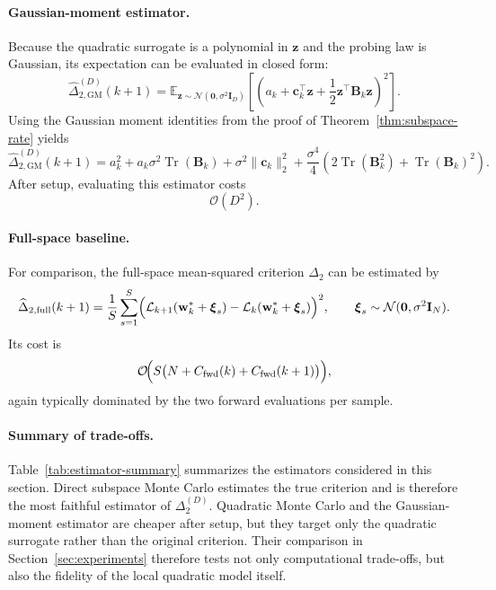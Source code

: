 \documentclass[10pt]{article}
\theoremstyle{plain}
\theoremstyle{remark}
\begin{document}
\paragraph{Gaussian-moment estimator.}
Because the quadratic surrogate is a polynomial in $\mathbf z$ and the probing law is Gaussian, its expectation can be evaluated in closed form:
\begin{equation}
\label{eq:quad-closed-form}
\widehat{\Delta}_{2,\mathrm{GM}}^{(D)}(k+1)
=
\mathbb E_{\mathbf z\sim\mathcal N(\mathbf 0, \sigma^2 \mathbf I_D)}
\left[
\left(
a_k + \mathbf c_k^\top \mathbf z + \frac12 \mathbf z^\top \mathbf B_k \mathbf z
\right)^2
\right].
\end{equation}
Using the Gaussian moment identities from the proof of Theorem~\ref{thm:subspace-rate} yields
\begin{equation}
\label{eq:quad-closed-form-expanded}
\widehat{\Delta}_{2,\mathrm{GM}}^{(D)}(k+1)
=
a_k^2
+
a_k \sigma^2 \operatorname{Tr}(\mathbf B_k)
+
\sigma^2 \|\mathbf c_k\|_2^2
+
\frac{\sigma^4}{4}
\left(
2\operatorname{Tr}(\mathbf B_k^2)
+
\operatorname{Tr}(\mathbf B_k)^2
\right).
\end{equation}
After setup, evaluating this estimator costs
\[
\mathcal O(D^2).
\]

\paragraph{Full-space baseline.}
For comparison, the full-space mean-squared criterion $\Delta_2$ can be estimated by
\begin{equation}
\label{eq:fullspace-mc}
\widehat{\Delta}_{2,\mathrm{full}}(k+1)
=
\frac{1}{S}\sum_{s=1}^S
\Bigl(
\mathcal L_{k+1}(\mathbf w_k^*+\boldsymbol{\xi}_s)
-
\mathcal L_k(\mathbf w_k^*+\boldsymbol{\xi}_s)
\Bigr)^2,
\qquad
\boldsymbol{\xi}_s \sim \mathcal N(\mathbf 0,\sigma^2\mathbf I_N).
\end{equation}
Its cost is
\[
\mathcal O\!\Bigl(
S\bigl(
N + C_{\mathrm{fwd}}(k)+C_{\mathrm{fwd}}(k+1)
\bigr)
\Bigr),
\]
again typically dominated by the two forward evaluations per sample.

\paragraph{Summary of trade-offs.}
Table~\ref{tab:estimator-summary} summarizes the estimators considered in this section.
Direct subspace Monte Carlo estimates the true criterion and is therefore the most faithful estimator of $\Delta_2^{(D)}$.
Quadratic Monte Carlo and the Gaussian-moment estimator are cheaper after setup, but they target only the quadratic surrogate rather than the original criterion.
Their comparison in Section~\ref{sec:experiments} therefore tests not only computational trade-offs, but also the fidelity of the local quadratic model itself.
\end{document}
